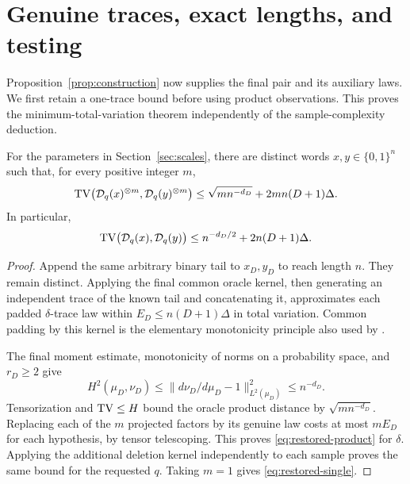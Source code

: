 \section{Genuine traces, exact lengths, and testing}\label{sec:transfer}

Proposition~\ref{prop:construction} now supplies the final pair and its auxiliary laws.  We first retain a one-trace bound before using product observations.  This proves the minimum-total-variation theorem independently of the sample-complexity deduction.

\begin{lemma}\label{lem:restoration}
For the parameters in Section~\ref{sec:scales}, there are distinct words $x,y\in\{0,1\}^n$ such that, for every positive integer $m$,
\begin{equation}\label{eq:restored-product}
 \operatorname{TV}\bigl(\mathcal D_q(x)^{\otimes m},\mathcal D_q(y)^{\otimes m}\bigr)
 \le \sqrt{m n^{-d_D}}+2mn(D+1)\Delta.
\end{equation}
In particular,
\begin{equation}\label{eq:restored-single}
 \operatorname{TV}\bigl(\mathcal D_q(x),\mathcal D_q(y)\bigr)
 \le n^{-d_D/2}+2n(D+1)\Delta.
\end{equation}
\end{lemma}

\begin{proof}
Append the same arbitrary binary tail to $x_D,y_D$ to reach length $n$.  They remain distinct.  Applying the final common oracle kernel, then generating an independent trace of the known tail and concatenating it, approximates each padded $\delta$-trace law within $E_D\le n(D+1)\Delta$ in total variation.  Common padding by this kernel is the elementary monotonicity principle also used by \citet[proof of Lemma 10]{MPV2014}.

The final moment estimate, monotonicity of norms on a probability space, and $r_D\ge2$ give
\[
 H^2(\mu_D,\nu_D)
 \le\|d\nu_D/d\mu_D-1\|_{L^2(\mu_D)}^2
 \le n^{-d_D}.
\]
Tensorization and $\operatorname{TV}\le H$ bound the oracle product distance by $\sqrt{m n^{-d_D}}$.  Replacing each of the $m$ projected factors by its genuine law costs at most $mE_D$ for each hypothesis, by tensor telescoping.  This proves \eqref{eq:restored-product} for $\delta$.  Applying the additional deletion kernel independently to each sample proves the same bound for the requested $q$.  Taking $m=1$ gives \eqref{eq:restored-single}.
\end{proof}

